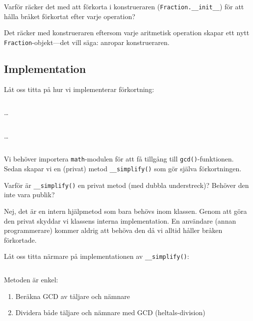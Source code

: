 \begin{exercise}
  Varför räcker det med att förkorta i konstrueraren 
  (\texttt{Fraction.__init__}) för att hålla bråket förkortat efter 
  varje operation?
\end{exercise}

Det räcker med konstrueraren eftersom varje aritmetisk operation skapar ett 
nytt \texttt{Fraction}-objekt---det vill säga: anropar 
konstrueraren.

\subsection{Implementation}

Låt oss titta på hur vi implementerar förkortning:

\begin{frame}[fragile]
  \inputminted[linenos,firstline=3,lastline=7]{python}{examples/myfrac_simplify.py}
  \dots
  \inputminted[autogobble=false,linenos,firstline=17,lastline=18]{python}{examples/myfrac_simplify.py}
  \dots
  \inputminted[autogobble=false,linenos,firstline=20,lastline=25]{python}{examples/myfrac_simplify.py}
\end{frame}

Vi behöver importera \texttt{math}-modulen för att få tillgång till 
\texttt{gcd()}-funktionen. Sedan skapar vi en (privat) metod 
\texttt{__simplify()} som gör själva förkortningen.

\begin{exercise}
  Varför är \texttt{__simplify()} en privat metod (med dubbla 
  understreck)? Behöver den inte vara publik?
\end{exercise}

Nej, det är en intern hjälpmetod som bara behövs inom klassen.
Genom att göra den privat skyddar vi klassens interna implementation.
En användare (annan programmerare) kommer aldrig att behöva den då vi alltid 
håller bråken förkortade.

Låt oss titta närmare på implementationen av \texttt{__simplify()}:

\begin{frame}[fragile]
  \inputminted[linenos,firstline=20,lastline=24]{python}{examples/myfrac_simplify.py}
\end{frame}

Metoden är enkel:
\begin{enumerate}
  \item Beräkna GCD av täljare och nämnare
  \item Dividera både täljare och nämnare med GCD (heltals-division)
\end{enumerate}

